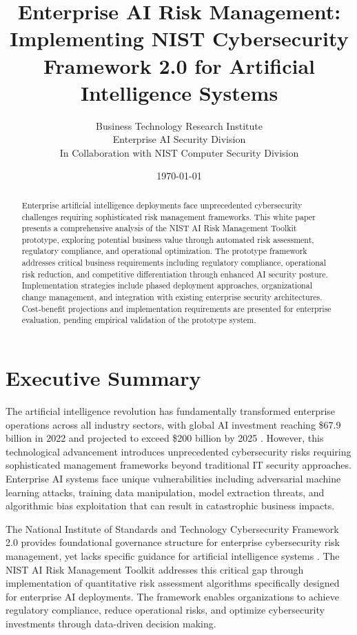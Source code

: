 \documentclass[11pt,letterpaper]{article}
\title{\textbf{Enterprise AI Risk Management: Implementing NIST Cybersecurity Framework 2.0 for Artificial Intelligence Systems}}
\author{
Business Technology Research Institute\\
Enterprise AI Security Division\\
In Collaboration with NIST Computer Security Division
}
\date{\today}
\begin{document}
\maketitle

\begin{abstract}
Enterprise artificial intelligence deployments face unprecedented cybersecurity challenges requiring sophisticated risk management frameworks. This white paper presents a comprehensive analysis of the NIST AI Risk Management Toolkit prototype, exploring potential business value through automated risk assessment, regulatory compliance, and operational optimization. The prototype framework addresses critical business requirements including regulatory compliance, operational risk reduction, and competitive differentiation through enhanced AI security posture. Implementation strategies include phased deployment approaches, organizational change management, and integration with existing enterprise security architectures. Cost-benefit projections and implementation requirements are presented for enterprise evaluation, pending empirical validation of the prototype system.
\end{abstract}

\section{Executive Summary}

The artificial intelligence revolution has fundamentally transformed enterprise operations across all industry sectors, with global AI investment reaching \$67.9 billion in 2022 and projected to exceed \$200 billion by 2025 \cite{McKinsey2023}. However, this technological advancement introduces unprecedented cybersecurity risks requiring sophisticated management frameworks beyond traditional IT security approaches. Enterprise AI systems face unique vulnerabilities including adversarial machine learning attacks, training data manipulation, model extraction threats, and algorithmic bias exploitation that can result in catastrophic business impacts.

The National Institute of Standards and Technology Cybersecurity Framework 2.0 provides foundational governance structure for enterprise cybersecurity risk management, yet lacks specific guidance for artificial intelligence systems \cite{NISTCSF2024}. The NIST AI Risk Management Toolkit addresses this critical gap through implementation of quantitative risk assessment algorithms specifically designed for enterprise AI deployments. The framework enables organizations to achieve regulatory compliance, reduce operational risks, and optimize cybersecurity investments through data-driven decision making.
\end{document}
